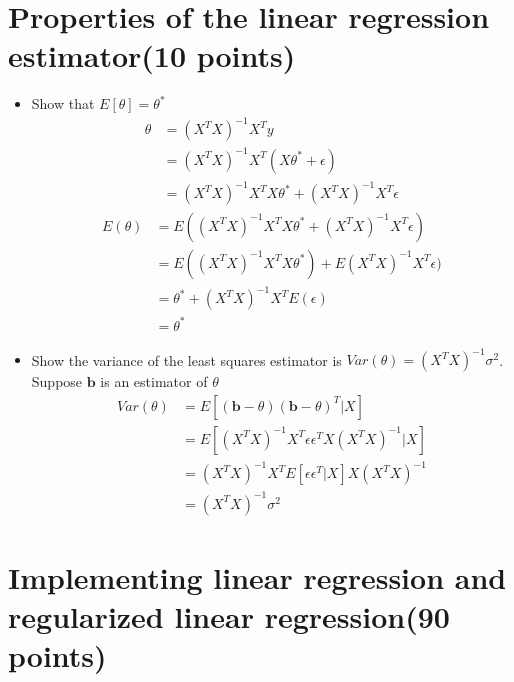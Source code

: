 \documentclass{article}
\begin{document}
\section{Properties of the linear regression estimator(10 points)}
\begin{itemize}
    \item Show that $E[\theta] = \theta^{*}$\\
    \begin{align*}
        \theta &= (X^{T}X)^{-1}X^{T}y\\
        &= (X^{T}X)^{-1}X^{T}(X\theta^{*} + \epsilon)\\
        &= (X^{T}X)^{-1}X^{T}X\theta^{*} + (X^{T}X)^{-1}X^{T}\epsilon
    \end{align*}
    \begin{align*}
        E(\theta) &= E((X^{T}X)^{-1}X^{T}X\theta^{*} + (X^{T}X)^{-1}X^{T}\epsilon)\\
        &= E((X^{T}X)^{-1}X^{T}X\theta^{*}) + E(X^{T}X)^{-1}X^{T}\epsilon)\\
        &= \theta^{*} + (X^{T}X)^{-1}X^{T}E(\epsilon)\\
        &= \theta^{*}
    \end{align*}
\item Show the variance of the least squares estimator is $Var(\theta) = (X^{T}X)^{-1}\sigma^2$. Suppose $\bm{b}$ is an estimator of $\theta$\\
\begin{align*}
    Var(\theta) &= E[(\bm{b} - \theta)(\bm{b} - \theta)^{T}|X]\\
    &= E[(X^{T}X)^{-1}X^{T}\epsilon\epsilon^{T}X(X^{T}X)^{-1}|X]\\
    &= (X^{T}X)^{-1}X^{T}E[\epsilon\epsilon^{T}|X]X(X^{T}X)^{-1}\\
    &= (X^{T}X)^{-1}\sigma^2
\end{align*}
\end{itemize}
\section{Implementing linear regression and regularized linear regression(90 points)}
\end{document}
